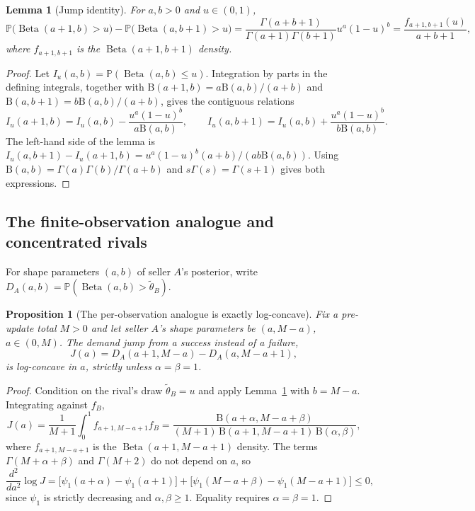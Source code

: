 \documentclass[11pt]{article}
\newcommand{\Pb}{\mathbb P}
\DeclareMathOperator{\Beta}{Beta}
\newcommand{\Bfun}{\mathrm{B}}
\newtheorem{proposition}{Proposition}
\newtheorem{lemma}{Lemma}
\theoremstyle{definition}
\begin{document}
\begin{lemma}[Jump identity]\label{lem:jump-identity}
For $a,b>0$ and $u\in(0,1)$,
\begin{equation*}
\Pb\bigl(\Beta(a+1,b)>u\bigr)-\Pb\bigl(\Beta(a,b+1)>u\bigr)
=\frac{\Gamma(a+b+1)}{\Gamma(a+1)\Gamma(b+1)}u^a(1-u)^b
=\frac{f_{a+1,b+1}(u)}{a+b+1},
\end{equation*}
where $f_{a+1,b+1}$ is the $\Beta(a+1,b+1)$ density.
\end{lemma}

\begin{proof}
Let $I_u(a,b)=\Pb(\Beta(a,b)\leq u)$. Integration by parts in the defining
integrals, together with $\Bfun(a+1,b)=a\Bfun(a,b)/(a+b)$ and
$\Bfun(a,b+1)=b\Bfun(a,b)/(a+b)$, gives the contiguous relations
\begin{equation*}
I_u(a+1,b)=I_u(a,b)-\frac{u^a(1-u)^b}{a\Bfun(a,b)},
\qquad
I_u(a,b+1)=I_u(a,b)+\frac{u^a(1-u)^b}{b\Bfun(a,b)}.
\end{equation*}
The left-hand side of the lemma is $I_u(a,b+1)-I_u(a+1,b)
=u^a(1-u)^b(a+b)/(ab\Bfun(a,b))$. Using
$\Bfun(a,b)=\Gamma(a)\Gamma(b)/\Gamma(a+b)$ and $s\Gamma(s)=\Gamma(s+1)$
gives both expressions.
\end{proof}

\subsection{The finite-observation analogue and concentrated rivals}

For shape parameters $(a,b)$ of seller $A$'s posterior, write
$D_A(a,b)=\Pb(\Beta(a,b)>\widetilde\theta_B)$.

\begin{proposition}[The per-observation analogue is exactly log-concave]
\label{prop:discrete-jump-logconcave}
Fix a pre-update total $M>0$ and let seller $A$'s shape parameters be
$(a,M-a)$, $a\in(0,M)$. The demand jump from a success instead of a failure,
\begin{equation*}
J(a)=D_A(a+1,M-a)-D_A(a,M-a+1),
\end{equation*}
is log-concave in $a$, strictly unless $\alpha=\beta=1$.
\end{proposition}

\begin{proof}
Condition on the rival's draw $\widetilde\theta_B=u$ and apply
Lemma~\ref{lem:jump-identity} with $b=M-a$. Integrating against $f_B$,
\begin{equation*}
J(a)=\frac{1}{M+1}\int_0^1f_{a+1,M-a+1}f_B
=\frac{\Bfun(a+\alpha,M-a+\beta)}
{(M+1)\,\Bfun(a+1,M-a+1)\,\Bfun(\alpha,\beta)},
\end{equation*}
where $f_{a+1,M-a+1}$ is the $\Beta(a+1,M-a+1)$ density. The terms
$\Gamma(M+\alpha+\beta)$ and $\Gamma(M+2)$ do not depend on $a$, so
\begin{equation*}
\frac{d^2}{da^2}\log J
=\bigl[\psi_1(a+\alpha)-\psi_1(a+1)\bigr]
+\bigl[\psi_1(M-a+\beta)-\psi_1(M-a+1)\bigr]\leq0,
\end{equation*}
since $\psi_1$ is strictly decreasing and $\alpha,\beta\geq1$. Equality
requires $\alpha=\beta=1$.
\end{proof}
\end{document}
